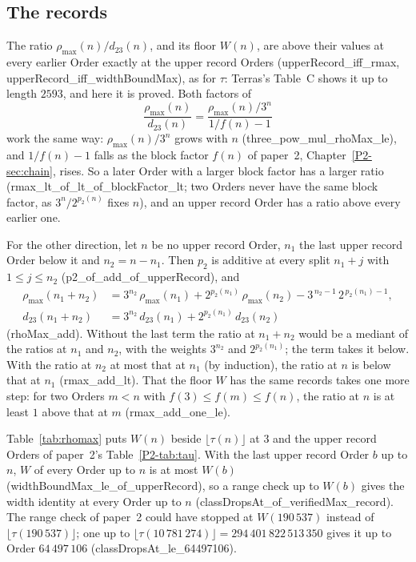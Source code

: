 \documentclass[10pt,a4paper,titlepage]{article}
\newcommand{\lean}[1]{\textsf{#1}}
\begin{document}
\subsection*{The records}

The ratio $\rho_{\max}(n)/d_{23}(n)$, and its floor $W(n)$, are above their values at every
earlier Order exactly at the upper record Orders (\lean{upperRecord\_iff\_rmax},
\lean{upperRecord\_iff\_widthBoundMax}), as for $\tau$: Terras's Table~C shows it up to length
$2593$, and here it is proved. Both factors of
\[
\frac{\rho_{\max}(n)}{d_{23}(n)} = \frac{\rho_{\max}(n)/3^n}{1/f(n) - 1}
\]
work the same way: $\rho_{\max}(n)/3^n$ grows with $n$ (\lean{three\_pow\_mul\_rhoMax\_le}), and
$1/f(n) - 1$ falls as the block factor $f(n)$ of paper~2, Chapter~\ref{P2-sec:chain}, rises. So a
later Order with a larger block factor has a larger ratio
(\lean{rmax\_lt\_of\_lt\_of\_blockFactor\_lt}; two Orders never have the same block factor, as $3^n/2^{p_2(n)}$ fixes $n$), and an upper record Order has a ratio above every
earlier one.

For the other direction, let $n$ be no upper record Order, $n_1$ the last upper record Order
below it and $n_2 = n - n_1$. Then $p_2$ is additive at every split $n_1 + j$ with $1 \le j \le n_2$
(\lean{p2\_of\_add\_of\_upperRecord}),
and
\[
\begin{aligned}
\rho_{\max}(n_1 + n_2) &= 3^{n_2}\,\rho_{\max}(n_1) + 2^{p_2(n_1)}\,\rho_{\max}(n_2)
  - 3^{\,n_2-1}\,2^{\,p_2(n_1)-1},\\
d_{23}(n_1 + n_2) &= 3^{n_2}\,d_{23}(n_1) + 2^{p_2(n_1)}\,d_{23}(n_2)
\end{aligned}
\]
(\lean{rhoMax\_add}). Without the last term the ratio at $n_1 + n_2$ would be a mediant of the
ratios at $n_1$ and $n_2$, with the weights $3^{n_2}$ and $2^{p_2(n_1)}$; the term takes it below. With
the ratio at $n_2$ at most that at $n_1$ (by induction), the ratio at $n$ is below that at $n_1$
(\lean{rmax\_add\_lt}). That the floor $W$ has the same records takes one more step: for
two Orders $m < n$ with $f(3) \le f(m) \le f(n)$, the ratio at $n$ is at least $1$ above
that at $m$ (\lean{rmax\_add\_one\_le}).

Table~\ref{tab:rhomax} puts $W(n)$ beside $\lfloor \tau(n) \rfloor$ at $3$ and the upper record
Orders of paper~2's Table~\ref{P2-tab:tau}. With the last upper record Order $b$ up to $n$,
$W$ of every Order up to $n$ is at most $W(b)$ (\lean{widthBoundMax\_le\_of\_upperRecord}), so
a range check up to $W(b)$ gives the width identity at every Order up to $n$
(\lean{classDropsAt\_of\_verifiedMax\_record}). The range check of paper~2 could have stopped
at $W(190\,537)$ instead of $\lfloor \tau(190\,537) \rfloor$; one up to
$\lfloor \tau(10\,781\,274) \rfloor = 294\,401\,822\,513\,350$ gives it up to Order $64\,497\,106$
(\lean{classDropsAt\_le\_64497106}).
\end{document}
